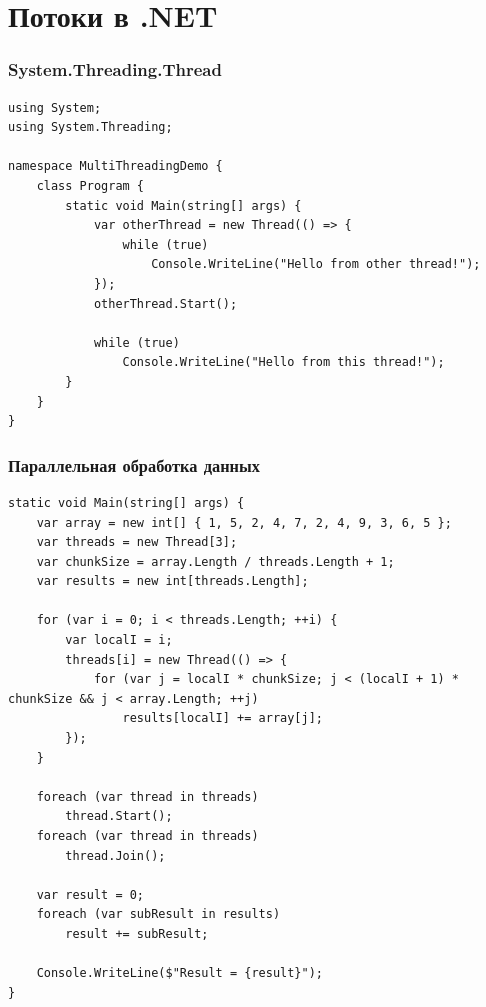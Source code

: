 \documentclass[xetex,mathserif,serif]{beamer}
\begin{document}
    \section{Потоки в .NET}

    \begin{frame}[fragile]
        \frametitle{System.Threading.Thread}
        \begin{footnotesize}
            \begin{verbatim}
using System;
using System.Threading;

namespace MultiThreadingDemo {
    class Program {
        static void Main(string[] args) {
            var otherThread = new Thread(() => {
                while (true)
                    Console.WriteLine("Hello from other thread!");
            });
            otherThread.Start();

            while (true)
                Console.WriteLine("Hello from this thread!");
        }
    }
}
            \end{verbatim}
        \end{footnotesize}
    \end{frame}

    \begin{frame}[fragile]
        \frametitle{Параллельная обработка данных}
        \begin{ssmall}
            \begin{verbatim}
static void Main(string[] args) {
    var array = new int[] { 1, 5, 2, 4, 7, 2, 4, 9, 3, 6, 5 };
    var threads = new Thread[3];
    var chunkSize = array.Length / threads.Length + 1;
    var results = new int[threads.Length];

    for (var i = 0; i < threads.Length; ++i) {
        var localI = i;
        threads[i] = new Thread(() => {
            for (var j = localI * chunkSize; j < (localI + 1) * chunkSize && j < array.Length; ++j)
                results[localI] += array[j];
        });
    }

    foreach (var thread in threads)
        thread.Start();
    foreach (var thread in threads)
        thread.Join();

    var result = 0;
    foreach (var subResult in results)
        result += subResult;

    Console.WriteLine($"Result = {result}");
}
            \end{verbatim}
        \end{ssmall}
    \end{frame}
\end{document}
